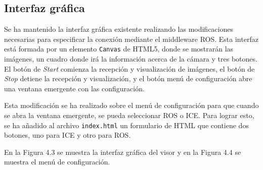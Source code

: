 \subsection{Interfaz gráfica}
Se ha mantenido la interfaz gráfica existente realizando las modificaciones necesarias para especificar la conexión mediante el middleware ROS. Esta interfaz está formada por un elemento \texttt{Canvas} de HTML5, donde se mostrarán las imágenes, un cuadro donde irá la información acerca de la cámara y tres botones. El botón de \textit{Start} comienza la recepción y visualización de imágenes, el botón de \textit{Stop} detiene la recepción y visualización, y el botón menú de configuración abre una ventana emergente con las configuración.

Esta modificación se ha realizado sobre el menú de configuración para que cuando se abra la ventana emergente, se pueda seleccionar ROS o ICE. Para lograr esto, se ha añadido al archivo \texttt{index.html} un formulario de HTML que contiene dos botones, uno para ICE y otro para ROS. 

En la Figura 4.3 se muestra la interfaz gráfica del visor y en la Figura 4.4 se muestra el menú de configuración.

